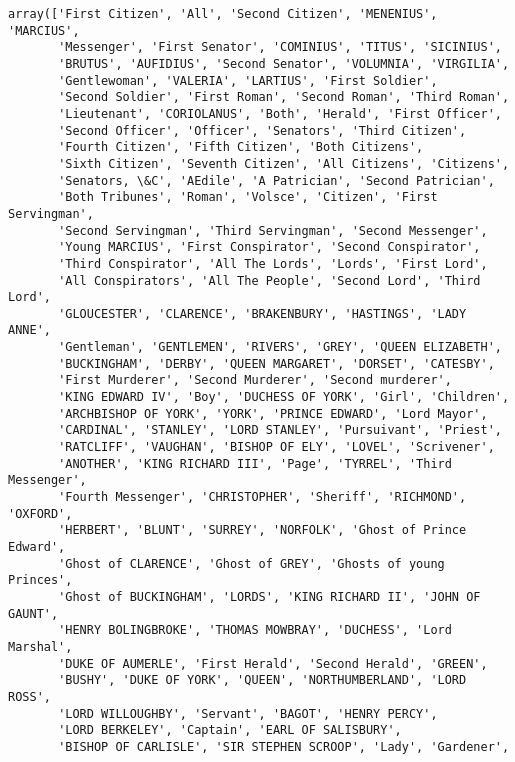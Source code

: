 \documentclass[11pt]{article}
\makeatletter
\newcommand{\boxspacing}{\kern\kvtcb@left@rule\kern\kvtcb@boxsep}
\newcommand{\prompt}[4]{
        \ttfamily\llap{{\color{#2}[#3]:\hspace{3pt}#4}}\vspace{-\baselineskip}
    }
\makeatother
\begin{document}
            \begin{tcolorbox}[breakable, size=fbox, boxrule=.5pt, pad at break*=1mm, opacityfill=0]
\prompt{Out}{outcolor}{111}{\boxspacing}
\begin{Verbatim}[commandchars=\\\{\}]
array(['First Citizen', 'All', 'Second Citizen', 'MENENIUS', 'MARCIUS',
       'Messenger', 'First Senator', 'COMINIUS', 'TITUS', 'SICINIUS',
       'BRUTUS', 'AUFIDIUS', 'Second Senator', 'VOLUMNIA', 'VIRGILIA',
       'Gentlewoman', 'VALERIA', 'LARTIUS', 'First Soldier',
       'Second Soldier', 'First Roman', 'Second Roman', 'Third Roman',
       'Lieutenant', 'CORIOLANUS', 'Both', 'Herald', 'First Officer',
       'Second Officer', 'Officer', 'Senators', 'Third Citizen',
       'Fourth Citizen', 'Fifth Citizen', 'Both Citizens',
       'Sixth Citizen', 'Seventh Citizen', 'All Citizens', 'Citizens',
       'Senators, \&C', 'AEdile', 'A Patrician', 'Second Patrician',
       'Both Tribunes', 'Roman', 'Volsce', 'Citizen', 'First Servingman',
       'Second Servingman', 'Third Servingman', 'Second Messenger',
       'Young MARCIUS', 'First Conspirator', 'Second Conspirator',
       'Third Conspirator', 'All The Lords', 'Lords', 'First Lord',
       'All Conspirators', 'All The People', 'Second Lord', 'Third Lord',
       'GLOUCESTER', 'CLARENCE', 'BRAKENBURY', 'HASTINGS', 'LADY ANNE',
       'Gentleman', 'GENTLEMEN', 'RIVERS', 'GREY', 'QUEEN ELIZABETH',
       'BUCKINGHAM', 'DERBY', 'QUEEN MARGARET', 'DORSET', 'CATESBY',
       'First Murderer', 'Second Murderer', 'Second murderer',
       'KING EDWARD IV', 'Boy', 'DUCHESS OF YORK', 'Girl', 'Children',
       'ARCHBISHOP OF YORK', 'YORK', 'PRINCE EDWARD', 'Lord Mayor',
       'CARDINAL', 'STANLEY', 'LORD STANLEY', 'Pursuivant', 'Priest',
       'RATCLIFF', 'VAUGHAN', 'BISHOP OF ELY', 'LOVEL', 'Scrivener',
       'ANOTHER', 'KING RICHARD III', 'Page', 'TYRREL', 'Third Messenger',
       'Fourth Messenger', 'CHRISTOPHER', 'Sheriff', 'RICHMOND', 'OXFORD',
       'HERBERT', 'BLUNT', 'SURREY', 'NORFOLK', 'Ghost of Prince Edward',
       'Ghost of CLARENCE', 'Ghost of GREY', 'Ghosts of young Princes',
       'Ghost of BUCKINGHAM', 'LORDS', 'KING RICHARD II', 'JOHN OF GAUNT',
       'HENRY BOLINGBROKE', 'THOMAS MOWBRAY', 'DUCHESS', 'Lord Marshal',
       'DUKE OF AUMERLE', 'First Herald', 'Second Herald', 'GREEN',
       'BUSHY', 'DUKE OF YORK', 'QUEEN', 'NORTHUMBERLAND', 'LORD ROSS',
       'LORD WILLOUGHBY', 'Servant', 'BAGOT', 'HENRY PERCY',
       'LORD BERKELEY', 'Captain', 'EARL OF SALISBURY',
       'BISHOP OF CARLISLE', 'SIR STEPHEN SCROOP', 'Lady', 'Gardener',

\end{Verbatim}
\end{tcolorbox}
\end{document}
